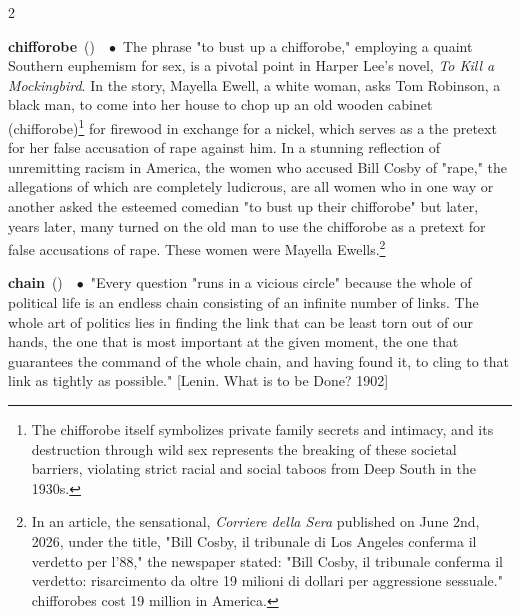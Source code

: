 \documentclass[10pt,a4paper,twoside]{article} %
\newcommand{\entry}[4]{\markboth{#1}{#1}\textbf{#1}\ {(#2)}\ \textit{#3}\ $\bullet$\ {#4}}  %
\begin{document}
\begin{multicols}{2}
\entry{chifforobe} {} {} {The phrase "to bust up a chifforobe," employing a quaint Southern euphemism for sex, is a pivotal point in Harper Lee's novel, \textenglish{\emph{To Kill a Mockingbird}}. In the story, Mayella Ewell, a white woman, asks Tom Robinson, a black man, to come into her house to chop up an old wooden cabinet (chifforobe)\footnote{The chifforobe itself symbolizes private family secrets and intimacy, and its destruction through wild sex represents the breaking of these societal barriers, violating strict racial and social taboos from Deep South in the 1930s.} for firewood in exchange for a nickel, which serves as a the pretext for her false accusation of rape against him. \newline \indent In a stunning reflection of unremitting racism in America, the women who accused Bill Cosby of "rape," the allegations of which are completely ludicrous, are all women who in one way or another asked the esteemed comedian "to bust up their chifforobe" but later, years later, many turned on the old man to use the chifforobe as a pretext for false accusations of rape. These women were Mayella Ewells.\footnote{In an article, the sensational, \textitalian{\emph{Corriere della Sera}} published on June 2nd, 2026, under the title, "Bill Cosby, il tribunale di Los Angeles conferma il verdetto per l'88," the newspaper stated: "Bill Cosby, il tribunale conferma il verdetto: risarcimento da oltre 19 milioni di dollari per aggressione sessuale." chifforobes cost 19 million in America.}}

\entry{chain} {} {} {"Every question "runs in a vicious circle" because the whole of political life is an endless chain consisting of an infinite number of links. The whole art of politics lies in finding the link that can be least torn out of our hands, the one that is most important at the given moment, the one that guarantees the command of the whole chain, and having found it, to cling to that link as tightly as possible." [Lenin. What is to be Done? 1902]} 


\end{multicols}
\end{document}
